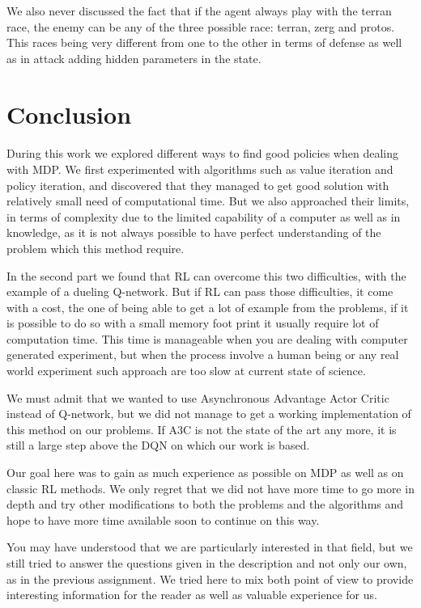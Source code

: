 \documentclass[twocolumn,a4paper,10pt]{article}
\begin{document}
We also never discussed the fact that if the agent always play with
the terran race, the enemy can be any of the three possible race:
terran, zerg and protos. This races being very different from one
to the other in terms of defense as well as in attack adding hidden
parameters in the state.

\section{Conclusion}

\paragraph{}

During this work we explored different ways to find good policies
when dealing with MDP. We first experimented with algorithms such
as value iteration and policy iteration, and discovered that they
managed to get good solution with relatively small need of computational
time. But we also approached their limits, in terms of complexity
due to the limited capability of a computer as well as in knowledge,
as it is not always possible to have perfect understanding
of the problem which this method require.

In the second part we found that RL can overcome this two difficulties,
with the example of a dueling Q-network. But if RL can pass those
difficulties, it come with a cost, the one of being able to get a
lot of example from the problems, if it is possible to do so with
a small memory foot print it usually require lot of computation time.
This time is manageable when you are dealing with computer generated
experiment, but when the process involve a human being or any real
world experiment such approach are too slow at current state of science.

We must admit that we wanted to use Asynchronous Advantage Actor Critic
\cite{A3C} instead of Q-network, but we did not manage to get a working
implementation of this method on our problems. If A3C is not the state
of the art any more, it is still a large step above the DQN on which
our work is based.

Our goal here was to gain as much experience as possible on MDP as
well as on classic RL methods. We only regret that we did not have
more time to go more in depth and try other modifications to both
the problems and the algorithms and hope to have more time available
soon to continue on this way.

You may have understood that we are particularly interested in that
field, but we still tried to answer the questions given in the description
and not only our own, as in the previous assignment. We tried here
to mix both point of view to provide interesting information for the
reader as well as valuable experience for us.




\end{document}
